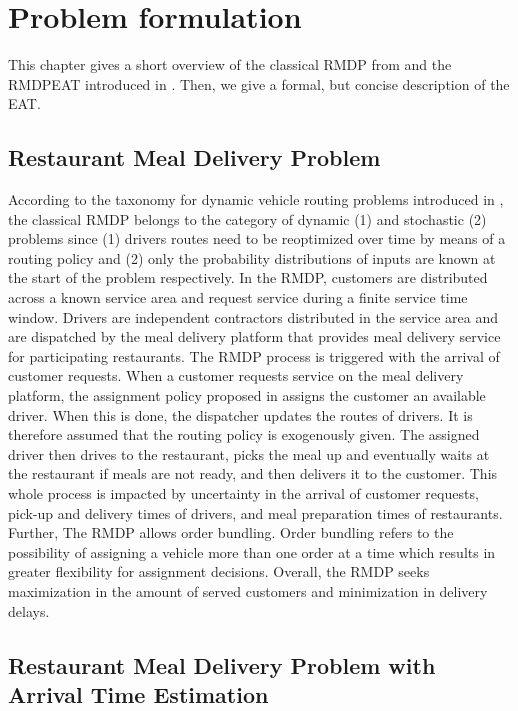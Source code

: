 \chapter{Problem formulation}

This chapter gives a short overview of the classical RMDP from \cite{UlmerRMDP} and the RMDPEAT introduced in \cite{Hildebrandt2020_EAT}. Then, we give a formal, but concise description of the EAT.
\section{Restaurant Meal Delivery Problem}

According to the taxonomy for dynamic vehicle routing problems introduced in \cite{psaraftis}, the classical RMDP belongs to the category of dynamic (1) and stochastic (2) problems since (1) drivers routes need to be reoptimized over time by means of a routing policy and (2) only the probability distributions of inputs are known at the start of the problem respectively. In the RMDP, customers are distributed across a known service area and request service during a finite service time window. Drivers are independent contractors distributed in the service area and are dispatched by the meal delivery platform that provides meal delivery service for participating restaurants. The RMDP process is triggered with the arrival of customer requests. When a customer requests service on the meal delivery platform, the assignment policy proposed in \cite{UlmerRMDP} assigns the customer an available driver. When this is done, the dispatcher updates the routes of drivers. It is therefore assumed that the routing policy is exogenously given. The assigned driver then drives to the restaurant, picks the meal up and eventually waits at the restaurant if meals are not ready, and then delivers it to the customer. This whole process is impacted by uncertainty in the arrival of customer requests, pick-up and delivery times of drivers, and meal preparation times of restaurants. Further, The RMDP allows order bundling. Order bundling refers to the possibility of assigning a vehicle more than one order at a time which results in greater flexibility for assignment decisions.  
Overall, the RMDP seeks maximization in the amount of served customers and minimization in delivery delays.
 
\section{Restaurant Meal Delivery Problem with Arrival Time Estimation}

